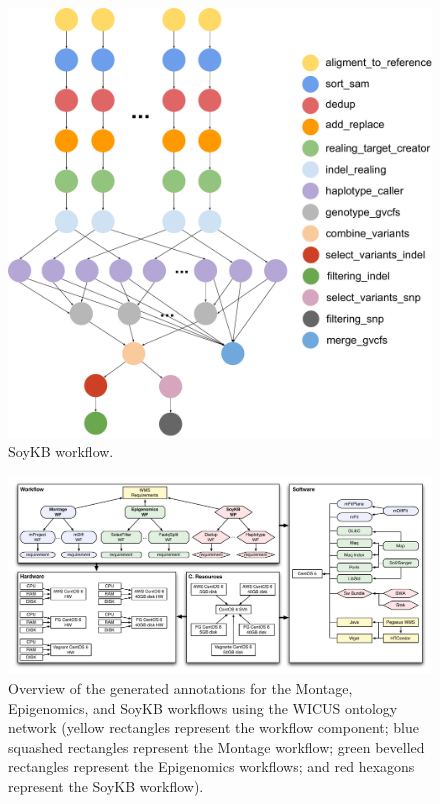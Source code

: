 \begin{figure}[!t]
	\centering
	\includegraphics[width=0.9\linewidth]{figures/workflow-soybean}
	\caption{SoyKB workflow.}
	\label{fig:workflow-soykb}
\end{figure}


\begin{figure}[!htb]
	\centering
	\includegraphics[width=\linewidth]{figures/annotations}
	\vspace{-20pt}
	\caption{Overview of the generated annotations for the Montage, Epigenomics, and 
  	  SoyKB workflows using the WICUS ontology network (yellow rectangles represent the 
	  workflow component; blue squashed rectangles represent the Montage workflow; green 
	  bevelled rectangles represent the Epigenomics workflows; and red hexagons represent 
	  the SoyKB workflow).}
	\label{fig:annotations}
\end{figure}


